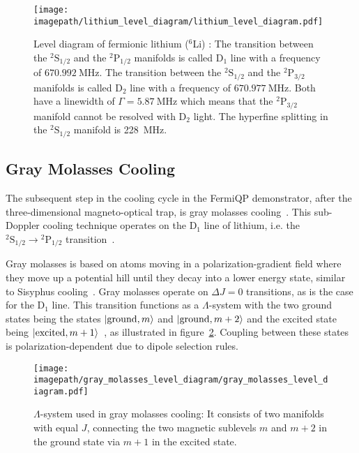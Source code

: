 \begin{figure}
    \centering
    \texttt{[image: \\imagepath/lithium\_level\_diagram/lithium\_level\_diagram.pdf]}
    \caption{Level diagram of fermionic lithium ($^6$Li) \cite{gehm_properties_2003, scherf_re-measurement_1996}: The transition between the  $^2\text{S}_{1/2}$ and the $^2\text{P}_{1/2}$ manifolds is called D$_1$ line with a frequency of $\SI{670.992}{\mega\hertz}$. The transition between the  $^2\text{S}_{1/2}$ and the $^2\text{P}_{3/2}$ manifolds is called D$_2$ line with a frequency of $\SI{670.977}{\mega\hertz}$. Both have a linewidth of $\Gamma = \SI{5.87}{\mega\hertz}$ which means that the $^2\text{P}_{3/2}$ manifold cannot be resolved with D$_2$ light. The hyperfine splitting in the $^2\text{S}_{1/2}$ manifold is \SI{228}{\mega\hertz}.}
    \label{fig:lithium_level_diagram}
\end{figure}

\subsection*{Gray Molasses Cooling}
The subsequent step in the cooling cycle in the FermiQP demonstrator, after the three-dimensional magneto-optical trap, is gray molasses cooling~\cite{grynberg_proposal_1994,weidemuller_novel_1994}. This sub-Doppler cooling technique operates on the D$_1$ line of lithium, i.e. the $^2\text{S}_{1/2} \rightarrow {^2\text{P}_{1/2}}$ transition~\cite{burchianti_efficient_2014}.

Gray molasses is based on atoms moving in a polarization-gradient field where they move up a potential hill until they decay into a lower energy state, similar to Sisyphus cooling~\cite{foot_atomic_2005}. Gray molasses operate on $\Delta J = 0$ transitions, as is the case for the D$_1$ line. This transition functions as a $\Lambda$-system with the two ground states being the states $\Ket{\text{ground}, m}$ and $\Ket{\text{ground}, m + 2}$ and the excited state being $\Ket{\text{excited}, m + 1}$~\cite{weidemuller_novel_1994}, as illustrated in figure~\ref{fig:gray_molasses_level_diagram}. Coupling between these states is polarization-dependent due to dipole selection rules.
\begin{figure}
    \centering
    \texttt{[image: \\imagepath/gray\_molasses\_level\_diagram/gray\_molasses\_level\_diagram.pdf]}
    \caption{$\Lambda$-system used in gray molasses cooling: It consists of two manifolds with equal $J$, connecting the two magnetic sublevels $m$ and $m+2$ in the ground state via $m+1$ in the excited state.}
    \label{fig:gray_molasses_level_diagram}
\end{figure}

